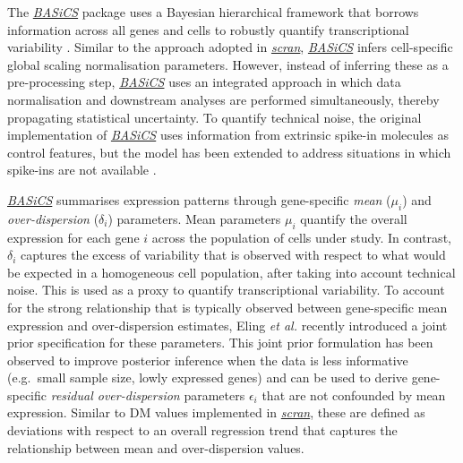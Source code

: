 \documentclass[9pt,a4paper,]{extarticle}
\begin{document}
The \emph{\href{https://bioconductor.org/packages/3.11/BASiCS}{BASiCS}} package uses a Bayesian hierarchical framework
that borrows information across all genes and cells to robustly quantify
transcriptional variability \citep{Vallejos2015BASiCS}.
Similar to the approach adopted in \emph{\href{https://bioconductor.org/packages/3.11/scran}{scran}}, \emph{\href{https://bioconductor.org/packages/3.11/BASiCS}{BASiCS}}
infers cell-specific global scaling normalisation parameters.
However, instead of inferring these as a pre-processing step,
\emph{\href{https://bioconductor.org/packages/3.11/BASiCS}{BASiCS}} uses an integrated approach in which data normalisation
and downstream analyses are performed simultaneously, thereby propagating
statistical uncertainty.
To quantify technical noise, the original implementation of
\emph{\href{https://bioconductor.org/packages/3.11/BASiCS}{BASiCS}} uses information from extrinsic spike-in molecules as
control features, but the model has been extended to address situations in which
spike-ins are not available \citep{Eling2018}.

\emph{\href{https://bioconductor.org/packages/3.11/BASiCS}{BASiCS}} summarises expression patterns through
gene-specific \emph{mean} (\(\mu_i\)) and \emph{over-dispersion} (\(\delta_i\)) parameters.
Mean parameters \(\mu_i\) quantify the overall expression for each gene \(i\)
across the population of cells under study.
In contrast, \(\delta_i\) captures the excess of variability that is observed with
respect to what would be expected in a homogeneous cell population, after
taking into account technical noise.
This is used as a proxy to quantify transcriptional variability.
To account for the strong relationship that is typically observed
between gene-specific mean expression and over-dispersion estimates,
Eling \emph{et al.} \citep{Eling2018} recently introduced a joint prior specification for
these parameters.
This joint prior formulation has been observed to improve posterior inference
when the data is less informative (e.g.~small sample size, lowly expressed
genes) and can be used to derive gene-specific \emph{residual over-dispersion}
parameters \(\epsilon_i\) that are not confounded by mean expression.
Similar to DM values implemented in \emph{\href{https://bioconductor.org/packages/3.11/scran}{scran}}, these are defined as
deviations with respect to an overall regression trend that captures the
relationship between mean and over-dispersion values.
\end{document}
